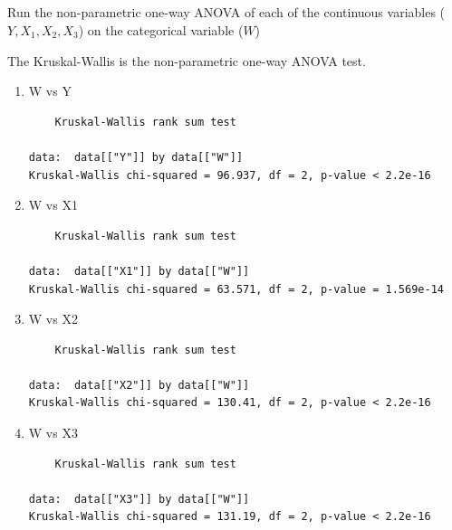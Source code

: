 \documentclass{article}
\begin{document}
\subsection{}
Run the non-parametric one-way ANOVA of each of the continuous variables ($Y,
X_1, X_2, X_3$) on the categorical variable ($W$)

The Kruskal-Wallis is the non-parametric one-way ANOVA test.
\begin{enumerate}
  \item W vs Y
  \begin{lstlisting}
  	Kruskal-Wallis rank sum test

data:  data[["Y"]] by data[["W"]]
Kruskal-Wallis chi-squared = 96.937, df = 2, p-value < 2.2e-16
  \end{lstlisting}
  \item W vs X1
  \begin{lstlisting}
	Kruskal-Wallis rank sum test

data:  data[["X1"]] by data[["W"]]
Kruskal-Wallis chi-squared = 63.571, df = 2, p-value = 1.569e-14
  \end{lstlisting}
  \item W vs X2
  \begin{lstlisting}
	Kruskal-Wallis rank sum test

data:  data[["X2"]] by data[["W"]]
Kruskal-Wallis chi-squared = 130.41, df = 2, p-value < 2.2e-16
  \end{lstlisting}
  \item W vs X3
  \begin{lstlisting}
	Kruskal-Wallis rank sum test

data:  data[["X3"]] by data[["W"]]
Kruskal-Wallis chi-squared = 131.19, df = 2, p-value < 2.2e-16
  \end{lstlisting}
\end{enumerate}
\end{document}
